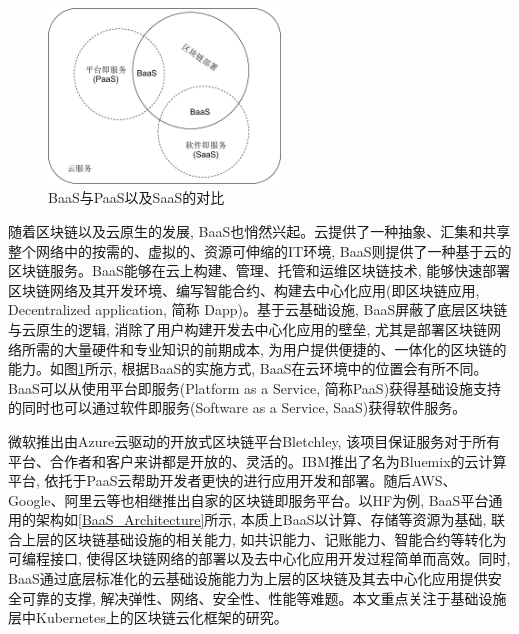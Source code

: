 \begin{figure}[h] %
    \centering %
    \includegraphics[width=0.55\textwidth]{FIGs/chapter2/BaaS_PaaS_SaaS.pdf} %
    \caption{BaaS与PaaS以及SaaS的对比} %
    \label{BaaS_PaaS_SaaS} %
\end{figure}%

随着区块链以及云原生的发展, BaaS也悄然兴起。云提供了一种抽象、汇集和共享整个网络中的按需的、虚拟的、资源可伸缩的IT环境, BaaS则提供了一种基于云的区块链服务。BaaS能够在云上构建、管理、托管和运维区块链技术, 能够快速部署区块链网络及其开发环境、编写智能合约、构建去中心化应用(即区块链应用, Decentralized application, 简称 Dapp)。基于云基础设施, BaaS屏蔽了底层区块链与云原生的逻辑, 消除了用户构建开发去中心化应用的壁垒, 尤其是部署区块链网络所需的大量硬件和专业知识的前期成本, 为用户提供便捷的、一体化的区块链的能力。如图\ref{BaaS_PaaS_SaaS}所示, 根据BaaS的实施方式, BaaS在云环境中的位置会有所不同\cite{onik2019performance}。BaaS可以从使用平台即服务(Platform as a Service, 简称PaaS)获得基础设施支持的同时也可以通过软件即服务(Software as a Service, SaaS)获得软件服务。

微软推出由Azure云驱动的开放式区块链平台Bletchley, 该项目保证服务对于所有平台、合作者和客户来讲都是开放的、灵活的\cite{BlockchainasaServiceNextGenerationofCloudServices}。IBM推出了名为Bluemix的云计算平台, 依托于PaaS云帮助开发者更快的进行应用开发和部署。随后AWS、Google、阿里云等也相继推出自家的区块链即服务平台。以HF为例, BaaS平台通用的架构如\ref{BaaS_Architecture}所示, 本质上BaaS以计算、存储等资源为基础, 联合上层的区块链基础设施的相关能力, 如共识能力、记账能力、智能合约等转化为可编程接口, 使得区块链网络的部署以及去中心化应用开发过程简单而高效。同时, BaaS通过底层标准化的云基础设施能力为上层的区块链及其去中心化应用提供安全可靠的支撑, 解决弹性、网络、安全性、性能等难题。本文重点关注于基础设施层中Kubernetes上的区块链云化框架的研究。

